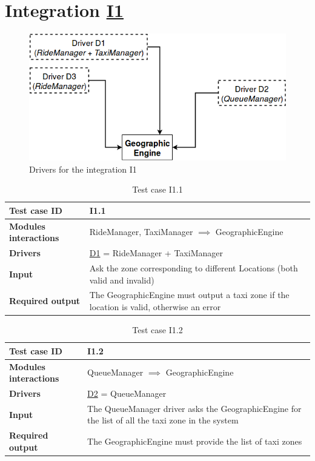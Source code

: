 \section{Integration \hyperref[I1]{I1} \label{int_I1}}
\begin{figure}[H]
\centering
\includegraphics[scale=0.5]{"../Analysis Documents/I1"}
\caption{Drivers for the integration I1}
\end{figure}
\begin{table}[H]
\begin{tabular}{ l | p{} }
\textbf{Test case ID} & I1.1 \\ \hline
\textbf{Modules interactions} & RideManager, TaxiManager $\implies$ GeographicEngine \\ \hline
\textbf{Drivers} &  \hyperref[D1]{D1} = RideManager + TaxiManager \\ \hline
\textbf{Input} & Ask the zone corresponding to different Locations (both valid and invalid) \\ \hline
\textbf{Required output} & The GeographicEngine must output a taxi zone if the location is valid, otherwise an error
\end{tabular}
\caption{Test case I1.1}
\end{table}

\begin{table}[H]
\begin{tabular}{ l | p{} }
\textbf{Test case ID} & I1.2 \\ \hline
\textbf{Modules interactions} & QueueManager $\implies$ GeographicEngine \\ \hline
\textbf{Drivers} &  \hyperref[D2]{D2} = QueueManager \\ \hline
\textbf{Input} & The QueueManager driver asks the GeographicEngine for the list of all the taxi zone in the system \\ \hline
\textbf{Required output} & The GeographicEngine must provide the list of taxi zones
\end{tabular}
\caption{Test case I1.2}
\end{table}

